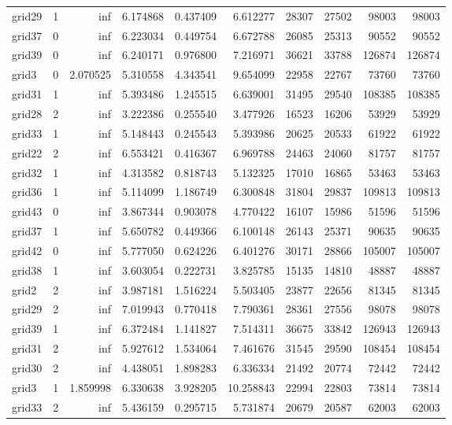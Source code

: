 \begin{longtable}{|l|r|r|r|r|r|r|r|r|r|}
grid29 & 1 & inf & 6.174868 & 0.437409 & 6.612277 & 28307 & 27502 & 98003 & 98003 \\
grid37 & 0 & inf & 6.223034 & 0.449754 & 6.672788 & 26085 & 25313 & 90552 & 90552 \\
grid39 & 0 & inf & 6.240171 & 0.976800 & 7.216971 & 36621 & 33788 & 126874 & 126874 \\
grid3 & 0 & 2.070525 & 5.310558 & 4.343541 & 9.654099 & 22958 & 22767 & 73760 & 73760 \\
grid31 & 1 & inf & 5.393486 & 1.245515 & 6.639001 & 31495 & 29540 & 108385 & 108385 \\
grid28 & 2 & inf & 3.222386 & 0.255540 & 3.477926 & 16523 & 16206 & 53929 & 53929 \\
grid33 & 1 & inf & 5.148443 & 0.245543 & 5.393986 & 20625 & 20533 & 61922 & 61922 \\
grid22 & 2 & inf & 6.553421 & 0.416367 & 6.969788 & 24463 & 24060 & 81757 & 81757 \\
grid32 & 1 & inf & 4.313582 & 0.818743 & 5.132325 & 17010 & 16865 & 53463 & 53463 \\
grid36 & 1 & inf & 5.114099 & 1.186749 & 6.300848 & 31804 & 29837 & 109813 & 109813 \\
grid43 & 0 & inf & 3.867344 & 0.903078 & 4.770422 & 16107 & 15986 & 51596 & 51596 \\
grid37 & 1 & inf & 5.650782 & 0.449366 & 6.100148 & 26143 & 25371 & 90635 & 90635 \\
grid42 & 0 & inf & 5.777050 & 0.624226 & 6.401276 & 30171 & 28866 & 105007 & 105007 \\
grid38 & 1 & inf & 3.603054 & 0.222731 & 3.825785 & 15135 & 14810 & 48887 & 48887 \\
grid2 & 2 & inf & 3.987181 & 1.516224 & 5.503405 & 23877 & 22656 & 81345 & 81345 \\
grid29 & 2 & inf & 7.019943 & 0.770418 & 7.790361 & 28361 & 27556 & 98078 & 98078 \\
grid39 & 1 & inf & 6.372484 & 1.141827 & 7.514311 & 36675 & 33842 & 126943 & 126943 \\
grid31 & 2 & inf & 5.927612 & 1.534064 & 7.461676 & 31545 & 29590 & 108454 & 108454 \\
grid30 & 2 & inf & 4.438051 & 1.898283 & 6.336334 & 21492 & 20774 & 72442 & 72442 \\
grid3 & 1 & 1.859998 & 6.330638 & 3.928205 & 10.258843 & 22994 & 22803 & 73814 & 73814 \\
grid33 & 2 & inf & 5.436159 & 0.295715 & 5.731874 & 20679 & 20587 & 62003 & 62003 \\

\end{longtable}
